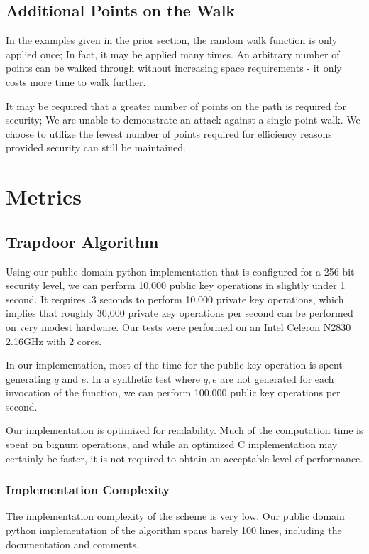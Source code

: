 \documentclass[preprint]{iacrtrans}
\begin{document}
\subsection{Additional Points on the Walk}
In the examples given in the prior section, the random walk function is only applied once; In fact, it may be applied many times. An arbitrary number of points can be walked through without increasing space requirements - it only costs more time to walk further. 

It may be required that a greater number of points on the path is required for security; We are unable to demonstrate an attack against a single point walk. We choose to utilize the fewest number of points required for efficiency reasons provided security can still be maintained. 


\section{Metrics}
\subsection{Trapdoor Algorithm}
Using our public domain python implementation that is configured for a 256-bit security level, we can perform 10,000 public key operations in slightly under 1 second. It requires .3 seconds to perform 10,000 private key operations, which implies that roughly 30,000 private key operations per second can be performed on very modest hardware. Our tests were performed on an Intel Celeron N2830 2.16GHz with 2 cores. 

In our implementation, most of the time for the public key operation is spent generating $q$ and $e$. In a synthetic test where $q, e$ are not generated for each invocation of the function, we can perform 100,000 public key operations per second.

Our implementation is optimized for readability. Much of the computation time is spent on bignum operations, and while an optimized C implementation may certainly be faster, it is not required to obtain an acceptable level of performance. 

\subsubsection{Implementation Complexity}
The implementation complexity of the scheme is very low. Our public domain python implementation of the algorithm spans barely 100 lines, including the documentation and comments.\\
\end{document}
